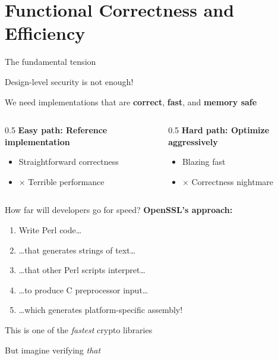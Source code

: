 \ifdefined\PRESENTATION\else\PassOptionsToClass{handout}{beamer}\fi\documentclass[aspectratio=169, lualatex]{beamer}
\begin{document}
\section{Functional Correctness and Efficiency}

\begin{frame}{The fundamental tension}
	\begin{center}
		\Large
		Design-level security is not enough!

		\vspace{0.5em}

		We need implementations that are \textbf{correct}, \textbf{fast}, and \textbf{memory safe}
	\end{center}
	\vspace{1em}
	\begin{columns}[c]
		\begin{column}{0.5\textwidth}
			\textbf{Easy path: Reference implementation}
			\begin{itemize}
				\item \mycheckmark Straightforward correctness
				\item $\times$ Terrible performance
			\end{itemize}
		\end{column}
		\begin{column}{0.5\textwidth}
			\textbf{Hard path: Optimize aggressively}
			\begin{itemize}
				\item \mycheckmark Blazing fast
				\item $\times$ Correctness nightmare
			\end{itemize}
		\end{column}
	\end{columns}
\end{frame}

\begin{frame}{How far will developers go for speed?}
	\textbf{OpenSSL's approach:}
	\begin{enumerate}
		\item Write Perl code\ldots
		\item \ldots that generates strings of text\ldots
		\item \ldots that other Perl scripts interpret\ldots
		\item \ldots to produce C preprocessor input\ldots
		\item \ldots which generates platform-specific assembly!
	\end{enumerate}
	\vspace{0.5em}
	\begin{center}
		\Large
		This is one of the \textit{fastest} crypto libraries

		\vspace{0.3em}

		\normalsize
		But imagine verifying \textit{that}
	\end{center}
\end{frame}
\end{document}
